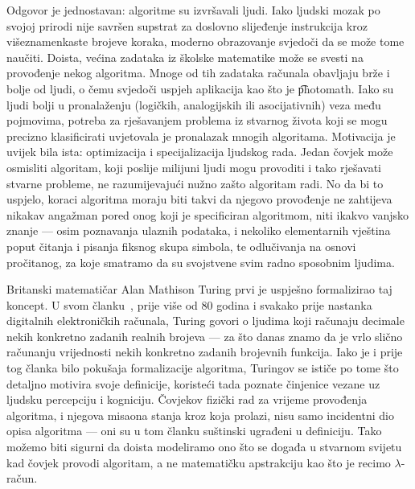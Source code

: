 Odgovor je jednostavan: algoritme su izvršavali ljudi. Iako ljudski mozak po svojoj prirodi nije savršen supstrat za doslovno slijeđenje instrukcija kroz višeznamenkaste brojeve koraka, moderno obrazovanje svjedoči da se može tome na\-u\-či\-ti. Doista, većina zadataka iz školske matematike može se svesti na provođenje nekog algoritma. Mnoge od tih zadataka računala obavljaju brže i bolje od ljudi, o čemu svjedoči uspjeh aplikacija kao što je \t{photomath}. Iako su ljudi bolji u pronalaženju (logičkih, analogijskih ili asocijativnih) veza među pojmovima, potreba za rješavanjem problema iz stvarnog života koji se mogu precizno klasificirati uvjetovala je pronalazak mnogih algoritama. Motivacija je uvijek bila ista: optimizacija i specijalizacija ljudskog rada. Jedan čovjek može osmisliti algoritam, koji poslije milijuni ljudi mogu provoditi i tako rješavati stvarne probleme, ne razumijevajući nužno zašto algoritam radi. No da bi to uspjelo, koraci algoritma moraju biti takvi da njegovo provođenje ne zahtijeva nikakav angažman pored onog koji je specificiran algoritmom, niti ikakvo vanjsko znanje --- osim poznavanja ulaznih podataka, i nekoliko elementarnih vještina poput čitanja i pisanja fiksnog skupa simbola, te odlučivanja na osnovi pročitanog, za koje smatramo da su svojstvene svim radno sposobnim ljudima.

Britanski matematičar Alan Mathison Turing prvi je uspješno formalizirao taj koncept. U svom članku~\cite{turing}, prije više od 80 godina i svakako prije nastanka digitalnih elektroničkih računala, Turing govori o ljudima koji računaju decimale nekih konkretno zadanih realnih brojeva --- za što danas znamo da je vrlo slično računanju vrijednosti nekih konkretno zadanih brojevnih funkcija. Iako je i prije tog članka bilo pokušaja formalizacije algoritma, Turingov se ističe po tome što detaljno motivira svoje definicije, koristeći tada poznate činjenice vezane uz ljudsku percepciju i kogniciju. Čovjekov fizički rad za vrijeme provođenja algoritma, i njegova misaona stanja kroz koja prolazi, nisu samo incidentni dio opisa algoritma --- oni su u tom članku suštinski ugrađeni u definiciju. Tako možemo biti sigurni da doista modeliramo ono što se događa u stvarnom svijetu kad čovjek provodi algoritam, a ne matematičku apstrakciju kao što je recimo $\lambda$-račun.


